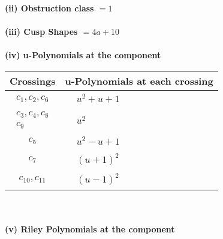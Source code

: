 \documentclass[1p]{elsarticle_modified}
\theoremstyle{definition}
\begin{document}
\flushleft \textbf{(ii) Obstruction class $= 1$}\\~\\
\flushleft \textbf{(iii) Cusp Shapes $= 4 a+10$}\\~\\
\newpage\renewcommand{\arraystretch}{1}
\flushleft \textbf{(iv) u-Polynomials at the component}\newline \\
\begin{tabular}{m{50pt}|m{274pt}}
Crossings & \hspace{64pt}u-Polynomials at each crossing \\
\hline $$\begin{aligned}c_{1},c_{2},c_{6}\end{aligned}$$&$\begin{aligned}
&u^2+u+1
\end{aligned}$\\
\hline $$\begin{aligned}c_{3},c_{4},c_{8}\\c_{9}\end{aligned}$$&$\begin{aligned}
&u^2
\end{aligned}$\\
\hline $$\begin{aligned}c_{5}\end{aligned}$$&$\begin{aligned}
&u^2- u+1
\end{aligned}$\\
\hline $$\begin{aligned}c_{7}\end{aligned}$$&$\begin{aligned}
&(u+1)^2
\end{aligned}$\\
\hline $$\begin{aligned}c_{10},c_{11}\end{aligned}$$&$\begin{aligned}
&(u-1)^2
\end{aligned}$\\
\hline
\end{tabular}\\~\\
\newpage\renewcommand{\arraystretch}{1}
\flushleft \textbf{(v) Riley Polynomials at the component}\newline \\
\end{document}

